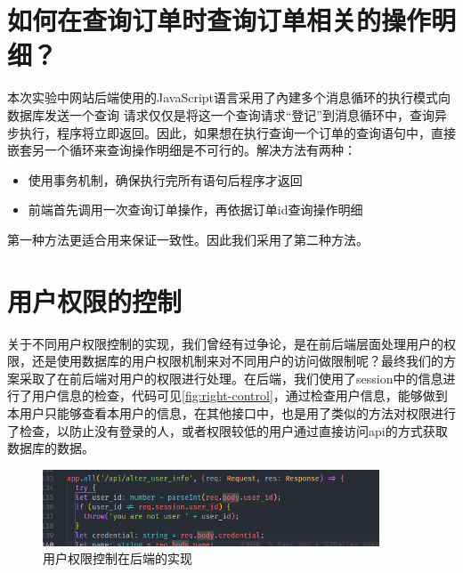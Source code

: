 \documentclass{myreport}
\begin{document}
\section{如何在查询订单时查询订单相关的操作明细？}

本次实验中网站后端使用的JavaScript语言采用了內建多个消息循环的执行模式向数据库发送一个查询
请求仅仅是将这一个查询请求“登记”到消息循环中，查询异步执行，程序将立即返回。因此，如果想在执行查询一个订单的查询语句中，直接嵌套另一个循环来查询操作明细是不可行的。解决方法有两种：

\begin{itemize}
    \item 使用事务机制，确保执行完所有语句后程序才返回
    \item 前端首先调用一次查询订单操作，再依据订单id查询操作明细
\end{itemize}

第一种方法更适合用来保证一致性。因此我们采用了第二种方法。


\section{用户权限的控制}

关于不同用户权限控制的实现，我们曾经有过争论，是在前后端层面处理用户的权限，还是使用数据库的用户权限机制来对不同用户的访问做限制呢？最终我们的方案采取了在前后端对用户的权限进行处理。在后端，我们使用了session中的信息进行了用户信息的检查，代码可见\autoref{fig:right-control}，通过检查用户信息，能够做到本用户只能够查看本用户的信息，在其他接口中，也是用了类似的方法对权限进行了检查，以防止没有登录的人，或者权限较低的用户通过直接访问api的方式获取数据库的数据。

\begin{figure}[htp]
    \centering
    \includegraphics[width=10cm]{figure/2018-12-22-13-03-10.png}
    \caption{用户权限控制在后端的实现}
    \label{fig:right-control}
\end{figure}
\end{document}
